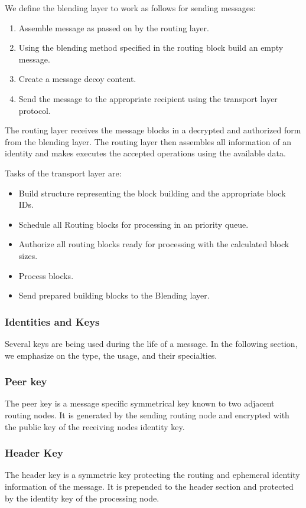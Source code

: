 \documentclass[10pt,journal,compsoc]{IEEEtran}
\begin{document}
We define the blending layer to work as follows for sending messages:
\begin{enumerate}
	\item Assemble message as passed on by the routing layer.
	\item Using the blending method specified in the routing block build an empty message. 
	\item Create a message decoy content.
	\item Send the message to the appropriate recipient using the transport layer protocol.
\end{enumerate}

The routing layer receives the message blocks in a decrypted and authorized form from the blending layer. The routing layer then assembles all information of an identity and makes executes the accepted operations using the available data. 

Tasks of the transport layer are:
\begin{itemize}
	\item Build structure representing the block building and the appropriate block IDs.
	\item Schedule all Routing blocks for processing in an priority queue.
	\item Authorize all routing blocks ready for processing with the calculated block sizes.
	\item Process blocks.
	\item Send prepared building blocks to the Blending layer.
\end{itemize}

\subsubsection{Identities and Keys}
Several keys are being used during the life of a message. In the following section, we emphasize on the type, the usage, and their specialties.

\subsubsection{Peer key}
The peer key is a message specific symmetrical key known to two adjacent routing nodes. It is generated by the sending routing node and encrypted with the public key of the receiving nodes identity key.

\subsubsection{Header Key}
The header key is a symmetric key protecting the routing and ephemeral identity information of the message. It is prepended to the header section and protected by the identity key of the processing node.
\end{document}
